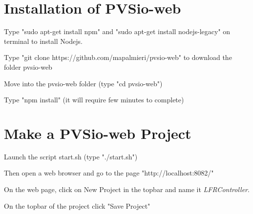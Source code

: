 \documentclass[11pt,a4paper]{../tutorial}
\begin{document}
\section{Installation of PVSio-web}
\begin{instructions}
\item Type "sudo apt-get install npm" and "sudo apt-get install nodejs-legacy" on terminal to install Nodejs.
\item Type "git clone https://github.com/mapalmieri/pvsio-web" to download the folder pvsio-web
\item Move into the pvsio-web folder (type "cd pvsio-web")
\item Type "npm install" (it will require few minutes to complete)

\end{instructions}
\section{Make a PVSio-web Project}
\begin{instructions}
\item Launch the script start.sh (type "./start.sh")
\item Then open a web browser and go to the page "http://localhost:8082/"
\item On the web page, click on New Project in the topbar and name it \emph{LFRController}.
\item On the topbar of the project click "Save Project"

\end{instructions}
\end{document}

